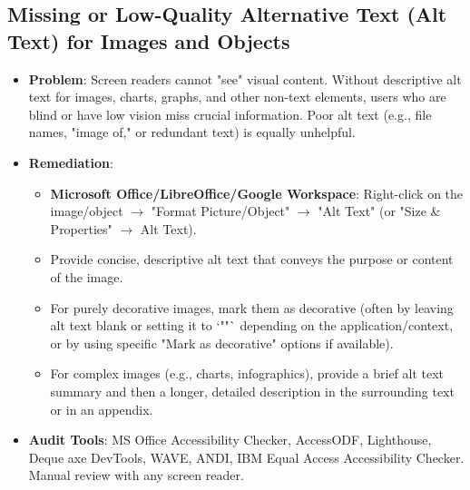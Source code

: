 \subsection{Missing or Low-Quality Alternative Text (Alt Text) for Images and Objects}
\label{subsec:missing-alt-text}
\begin{itemize}
    \item \textbf{Problem}: Screen readers cannot "see" visual content. Without descriptive alt text for images, charts, graphs, and other non-text elements, users who are blind or have low vision miss crucial information. Poor alt text (e.g., file names, "image of," or redundant text) is equally unhelpful.

    \item \textbf{Remediation}:
        \begin{itemize}
            \item \textbf{Microsoft Office/LibreOffice/Google Workspace}: Right-click on the image/object $\rightarrow$ "Format Picture/Object" $\rightarrow$ "Alt Text" (or "Size \& Properties" $\rightarrow$ Alt Text).
            \item Provide concise, descriptive alt text that conveys the purpose or content of the image.
            \item For purely decorative images, mark them as decorative (often by leaving alt text blank or setting it to `""` depending on the application/context, or by using specific "Mark as decorative" options if available).
            \item For complex images (e.g., charts, infographics), provide a brief alt text summary and then a longer, detailed description in the surrounding text or in an appendix.
        \end{itemize}

    \item \textbf{Audit Tools}: MS Office Accessibility Checker, AccessODF, Lighthouse, Deque axe DevTools, WAVE, ANDI, IBM Equal Access Accessibility Checker. Manual review with any screen reader.

\end{itemize}

